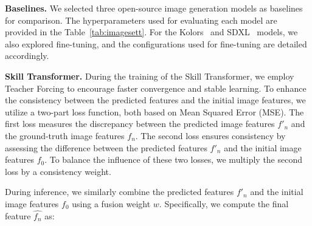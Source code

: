 \textbf{Baselines.} We selected three open-source image generation models as baselines for comparison. The hyperparameters used for evaluating each model are provided in the Table~\ref{tab:imagesett}. For the Kolors~\cite{kolors} and SDXL~\cite{sdxl} models, we also explored fine-tuning, and the configurations used for fine-tuning are detailed accordingly.

\begin{table}[h]
\centering
{}
\caption{Hyperparameters for baseline image models.}
\label{tab:imagesett}
\end{table}

\textbf{Skill Transformer.} During the training of the Skill Transformer, we employ Teacher Forcing to encourage faster convergence and stable learning. To enhance the consistency between the predicted features and the initial image features, we utilize a two-part loss function, both based on Mean Squared Error (MSE). The first loss measures the discrepancy between the predicted image features $f'_n$ and the ground-truth image features $f_n$. The second loss ensures consistency by assessing the difference between the predicted features $f'_n$ and the initial image features $f_0$. To balance the influence of these two losses, we multiply the second loss by a consistency weight.

During inference, we similarly combine the predicted features $f'_n$ and the initial image features $f_0$ using a fusion weight $w$. Specifically, we compute the final feature $\hat{f_n}$ as:  

